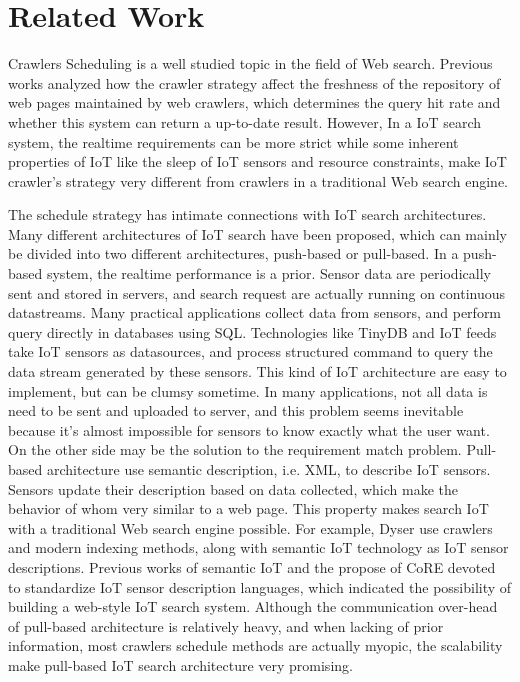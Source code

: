 \documentclass[conference]{IEEEtran}
\begin{document}
\section{Related Work}

Crawlers Scheduling is a well studied topic in the field of Web search. Previous works\cite{Cho2000}\cite{Wolf2002}\cite{Challenger2004} analyzed how the crawler strategy affect the freshness of the repository of web pages maintained by web crawlers, which determines the query hit rate and whether this system can return a up-to-date result. However, In a IoT search system, the realtime requirements can be more strict while some inherent properties of IoT like the sleep of IoT sensors and resource constraints, make IoT crawler's strategy very different from crawlers in a traditional Web search engine. 


The schedule strategy has intimate connections with IoT search architectures.
Many different architectures of IoT search have been proposed, which can mainly be divided into two different architectures, push-based or pull-based.
In a push-based system, the realtime performance is a prior. Sensor data are periodically sent and stored in servers, and search request are actually running on continuous datastreams. Many practical applications collect data from sensors, and perform query directly in databases using SQL. Technologies like TinyDB\cite{TinyDB} and IoT feeds\cite{Whitehouse2006} take IoT sensors as datasources, and process structured command to query the data stream generated by these sensors. This kind of IoT architecture are easy to implement, but can be clumsy sometime. In many applications, not all data is need to be sent and uploaded to server, and this problem seems inevitable because it's almost impossible for sensors to know exactly what the user want.
On the other side may be the solution to the requirement match problem.
Pull-based architecture use semantic description, i.e. XML, to describe IoT sensors. Sensors update their description based on data collected, which make the behavior of whom very similar to a web page. This property makes search IoT with a traditional Web search engine possible. For example, Dyser\cite{Dyser} use crawlers and modern indexing methods, along with semantic IoT technology as IoT sensor descriptions. Previous works of semantic IoT\cite{Compton2012} and the propose of CoRE\cite{CoREWorkingGroup2012} devoted to standardize IoT sensor description languages, which indicated the possibility of building a web-style IoT search system. Although the communication over-head of pull-based architecture is relatively heavy, and when lacking of prior information, most crawlers schedule methods are actually myopic, the scalability make pull-based IoT search architecture very promising.
\end{document}
